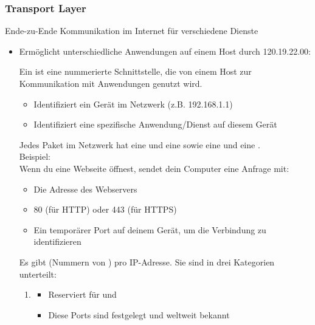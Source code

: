 \subsubsection*{Transport Layer}
 Ende-zu-Ende Kommunikation im Internet für verschiedene Dienste
\begin{itemize}
    \item Ermöglicht unterschiedliche Anwendungen auf einem Host durch  120.19.22.00:
    \begin{infoBox}[title=Was sind Ports?]
        Ein  ist eine nummerierte Schnittstelle, die von einem Host zur Kommunikation mit Anwendungen genutzt wird.
        \begin{itemize}
            \item {} Identifiziert ein Gerät im Netzwerk (z.B. 192.168.1.1)
            \item {} Identifiziert eine spezifische Anwendung/Dienst auf diesem Gerät
        \end{itemize}
        Jedes Paket im Netzwerk hat eine  und eine  sowie eine  und eine .\\
        Beispiel:\\
        Wenn du eine Webseite öffnest, sendet dein Computer eine Anfrage mit:
        \begin{itemize}
            \item {} Die Adresse des Webservers
            \item {} 80 (für HTTP) oder 443 (für HTTPS)
            \item {} Ein temporärer Port auf deinem Gerät, um die Verbindung zu identifizieren
        \end{itemize}
    \end{infoBox}
    \begin{infoBox}[title=Portnummern: Kategorien]
        Es gibt  (Nummern von ) pro IP-Adresse. Sie sind in drei Kategorien unterteilt:
        \begin{enumerate}
            \item {}
            \begin{itemize}
                \item Reserviert für  und 
                \item Diese Ports sind festgelegt und weltweit bekannt

\end{itemize}
\end{enumerate}
\end{infoBox}
\end{itemize}
